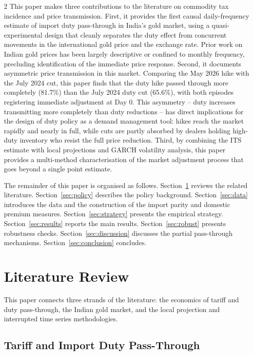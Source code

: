 \documentclass[12pt]{article}
\begin{document}
\begin{multicols}{2}
This paper makes three contributions to the literature on commodity tax incidence and price transmission. First, it provides the first causal daily-frequency estimate of import duty pass-through in India's gold market, using a quasi-experimental design that cleanly separates the duty effect from concurrent movements in the international gold price and the exchange rate. Prior work on Indian gold prices has been largely descriptive or confined to monthly frequency, precluding identification of the immediate price response. Second, it documents asymmetric price transmission in this market. Comparing the May 2026 hike with the July 2024 cut, this paper finds that the duty hike passed through more completely (81.7\%) than the July 2024 duty cut (65.6\%), with both episodes registering immediate adjustment at Day 0. This asymmetry -- duty increases transmitting more completely than duty reductions -- has direct implications for the design of duty policy as a demand management tool: hikes reach the market rapidly and nearly in full, while cuts are partly absorbed by dealers holding high-duty inventory who resist the full price reduction. Third, by combining the ITS estimate with local projections and GARCH volatility analysis, this paper provides a multi-method characterisation of the market adjustment process that goes beyond a single point estimate.

The remainder of this paper is organised as follows. Section~\ref{sec:lit} reviews the related literature. Section~\ref{sec:policy} describes the policy background. Section~\ref{sec:data} introduces the data and the construction of the import parity and domestic premium measures. Section~\ref{sec:strategy} presents the empirical strategy. Section~\ref{sec:results} reports the main results. Section~\ref{sec:robust} presents robustness checks. Section~\ref{sec:discussion} discusses the partial pass-through mechanisms. Section~\ref{sec:conclusion} concludes.

\section{Literature Review}
\label{sec:lit}

This paper connects three strands of the literature: the economics of tariff and duty pass-through, the Indian gold market, and the local projection and interrupted time series methodologies.

\subsection*{Tariff and Import Duty Pass-Through}


\end{multicols}
\end{document}
